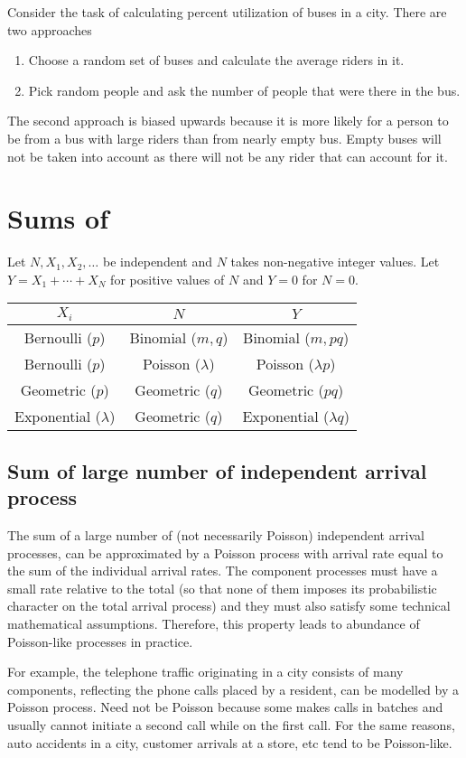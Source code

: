 \begin{example}
    Consider the task of calculating percent utilization of buses in a city. There are two approaches
    \begin{enumerate}
        \item Choose a random set of buses and calculate the average riders in it.
        \item Pick random people and ask the number of people that were there in the bus.
    \end{enumerate}
    The second approach is biased upwards because it is more likely for a person to be from a bus with large riders than from nearly empty bus. Empty buses will not be taken into account as there will not be any rider that can account for it.
\end{example}

\section{Sums of \RV}
Let $N,X_1,X_2,\ldots$ be independent \rv and $N$ takes non-negative integer values. Let $Y=X_1+\cdots+X_N$ for positive values of $N$ and $Y=0$ for $N=0$.

\begin{center} \begin{tabu}{|c|c|c|}
    \hline $X_i$ & $N$ & $Y$ \\ \hline
    Bernoulli ($p$) & Binomial ($m, q$) & Binomial ($m, pq$) \\
    Bernoulli ($p$) & Poisson ($\lambda$) & Poisson ($\lambda p$) \\
    Geometric ($p$) & Geometric ($q$) & Geometric ($pq$) \\
    Exponential ($\lambda$) & Geometric ($q$) & Exponential ($\lambda q$)\\
    \hline
\end{tabu} \end{center}

\subsection{Sum of large number of independent arrival process}
The sum of a large number of (not necessarily Poisson) independent arrival processes, can be approximated by a  Poisson process with arrival  rate equal to the sum of the individual arrival  rates. The component processes must have a small rate relative to the total (so that none of them imposes its probabilistic character on the total arrival process) and they must also satisfy some technical mathematical assumptions. Therefore, this property leads to abundance of Poisson-like processes in practice.

For example, the telephone traffic originating in  a city consists of many components, reflecting the phone calls placed by a resident, can be modelled by a Poisson process. Need not be Poisson because some makes calls in batches and usually cannot initiate a second call while on the first call. For the same reasons, auto accidents in a city, customer arrivals at a store, etc tend to be Poisson-like.